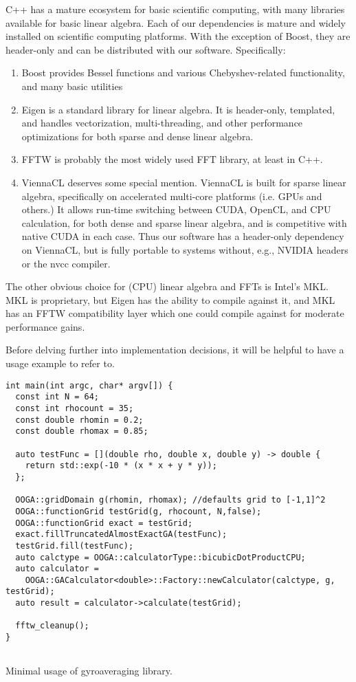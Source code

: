  C++ has a mature ecosystem for basic scientific computing, with many libraries available for basic linear algebra.  Each of our dependencies is mature and widely installed on scientific computing platforms.  With the exception of Boost, they are header-only and can be distributed with our software. Specifically:
 \begin{enumerate}
 	\item Boost provides Bessel functions and various Chebyshev-related functionality, and many basic utilities
 	\item Eigen is a standard library for linear algebra.  It is header-only, templated, and handles vectorization, multi-threading, and other performance optimizations for both sparse and dense linear algebra.
 	\item FFTW is probably the most widely used FFT library, at least in C++.
 	\item ViennaCL deserves some special mention.  ViennaCL is built for sparse linear algebra, specifically on accelerated multi-core platforms (i.e. GPUs and others.)  It allows run-time switching between CUDA, OpenCL, and CPU calculation, for both dense and sparse linear algebra, and is competitive with native CUDA in each case.  Thus our software has a header-only dependency on ViennaCL, but is fully portable to systems without, e.g., NVIDIA headers or the nvcc compiler.    
 \end{enumerate}
The other obvious choice for (CPU) linear algebra and FFTs is Intel's MKL.  MKL is proprietary, but Eigen has the ability to compile against it, and MKL has an FFTW compatibility layer which one could compile against for moderate performance gains. 

Before delving further into implementation decisions, it will be helpful to have a usage example to refer to. 

\begin{listing}[H]
	\begin{verbatim}
int main(int argc, char* argv[]) {
  const int N = 64;
  const int rhocount = 35;
  const double rhomin = 0.2;
  const double rhomax = 0.85;
  
  auto testFunc = [](double rho, double x, double y) -> double {
    return std::exp(-10 * (x * x + y * y));
  };
  
  OOGA::gridDomain g(rhomin, rhomax); //defaults grid to [-1,1]^2
  OOGA::functionGrid testGrid(g, rhocount, N,false); 
  OOGA::functionGrid exact = testGrid;
  exact.fillTruncatedAlmostExactGA(testFunc);
  testGrid.fill(testFunc);
  auto calctype = OOGA::calculatorType::bicubicDotProductCPU;
  auto calculator = 
    OOGA::GACalculator<double>::Factory::newCalculator(calctype, g, testGrid);
  auto result = calculator->calculate(testGrid);
  
  fftw_cleanup();
}
    
  \end{verbatim}
  
\caption{Minimal usage of gyroaveraging library.}
\label{lst:example}
\end{listing}

